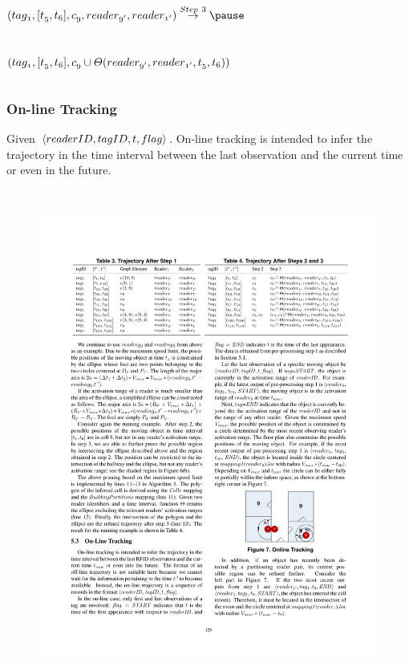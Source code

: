 \begin{frame}
\begin{columns}[c]
{  $\mathnormal{(tag_1, [t_5,t_6], c_9, reader_{9'}, reader_{1'})} \overset{Step~3}{\rightarrow} \pause$ \\~\\~\\

  $\mathnormal{(tag_1, [t_5,t_6], c_9 \cup \Theta(reader_{9'}, reader_{1'}, t_5, t_6))}$
}

\end{columns}

\end{frame}


\begin{frame}
\frametitle{On-line Tracking}

\small{\textrm{Given $\mathnormal{\langle readerID, tagID, t, flag \rangle}$. On-line tracking is intended to infer the trajectory in the time interval between the last observation and the current time or even in the future.}}
\\~\\

\begin{columns}[c]

  \begin{figure}[tb]
    \includegraphics[width=\columnwidth]{figures/2-1/2-1-13.pdf}
  \end{figure}



\end{columns}
\end{frame}
